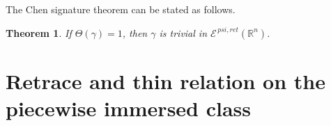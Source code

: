 \documentclass{amsart}
\newtheorem{theorem}{Theorem}[section]
\begin{document}



The Chen signature theorem can be stated as follows.

\begin{theorem}\label{Chen_Signature_Theorem}
If $\Theta(\gamma)=1$, then $\gamma$ is trivial in ${\mathcal E}^{\,psi,ret}(\mathbb R^n)$. 
\end{theorem}




\section{Retrace and thin relation on the piecewise immersed class}\label{section_Juan}
\end{document}
